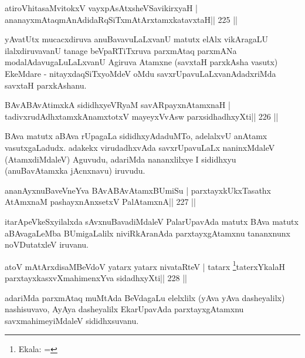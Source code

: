 
\begin{shl}
atiroVhitasaMvitokxV vayxpAsAtxsheVSavikirxyaH |
ananayxmAtaqmAnAdidaRqSiTxmAtArxtamxkatavxtaH\hfill || 225 ||
\end{shl}

\begin{artha}
yAvatUtx mucacxdiruva anuBavavuLaLxvanU matutx elAlx vikAragaLU ilalxdiruvavanU tanage beVpaRTiTxruva parxmAtaq parxmANa modalAdavugaLuLaLxvanU Agiruva Atamxne (savxtaH parxkAsha vasutx) EkeMdare - nitayxdaqSiTxyoMdeV oMdu savxrUpavuLaLxvanAdadxriMda savxtaH parxkAshanu.
\end{artha}

\begin{shl}
BAvABAvAtimxkA sididhxyeVRyaM savAR\s payxnAtamxnaH |
tadivxrudAdhxtamxkAnamxtotxV mayeyxVvAsw parxsidhadhxyXti\hfill || 226 ||
\end{shl}

\begin{artha}
BAva matutx aBAva rUpagaLa sididhxyAdaduMTo, adelalxvU anAtamx vasutxgaLadudx. adakekx virudadhxvAda savxrUpavuLaLx naninxMdaleV (AtamxdiMdaleV) Aguvudu, adariMda nananxlilxye I sididhxyu (anuBavAtamxka jAcnxnavu) iruvudu.
\end{artha}

\begin{shl}
ananAyxnuBaveVneYva BAvABAvAtamxBUmiSu |
parxtayxkUkxTasathx AtAmxnaM pashayxnAnxsetxV PalAtamxnA\hfill || 227 ||
\end{shl}

\begin{artha}
itarApeVkeSxyilalxda sAvxnuBavadiMdaleV PalarUpavAda matutx BAva matutx aBAvagaLeMba BUmigaLalilx niviRkAranAda parxtayxgAtamxnu tananxnunx noVDutatxleV iruvanu.
\end{artha}


\begin{shl}
atoV mAtArxdisaMBeVdoV yatarx yatarx nivataRteV |
tatarx \footnote{Ekala: =}taterxYkalaH parxtayxkasxvXmahimenxYva sidadhxyXti\hfill || 228 ||
\end{shl}

\begin{artha}
adariMda parxmAtaq muMtAda BeVdagaLu elelxlilx (yAva yAva dasheyalilx) nashisuvavo, AyAya dasheyalilx EkarUpavAda parxtayxgAtamxnu savxmahimeyiMdaleV sididhxsuvanu.
\end{artha}

